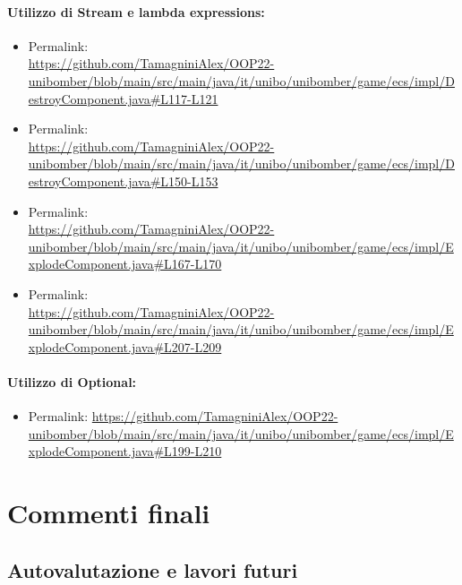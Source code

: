 \documentclass[a4paper,12pt]{report}
\begin{document}
\subsubsection*{Utilizzo di Stream e lambda expressions:}
\begin{itemize}
    \item Permalink: 
    \\ \url{https://github.com/TamagniniAlex/OOP22-unibomber/blob/main/src/main/java/it/unibo/unibomber/game/ecs/impl/DestroyComponent.java#L117-L121}
    \item Permalink: 
    \\\url{https://github.com/TamagniniAlex/OOP22-unibomber/blob/main/src/main/java/it/unibo/unibomber/game/ecs/impl/DestroyComponent.java#L150-L153}
    \item Permalink: 
    \\\url{https://github.com/TamagniniAlex/OOP22-unibomber/blob/main/src/main/java/it/unibo/unibomber/game/ecs/impl/ExplodeComponent.java#L167-L170}
    \item Permalink: 
    \\\url{https://github.com/TamagniniAlex/OOP22-unibomber/blob/main/src/main/java/it/unibo/unibomber/game/ecs/impl/ExplodeComponent.java#L207-L209}
\end{itemize}
\subsubsection*{Utilizzo di Optional:}
\begin{itemize}
    \item Permalink: \url{https://github.com/TamagniniAlex/OOP22-unibomber/blob/main/src/main/java/it/unibo/unibomber/game/ecs/impl/ExplodeComponent.java#L199-L210}
\end{itemize}

\chapter{Commenti finali}

\section{Autovalutazione e lavori futuri}
\end{document}
